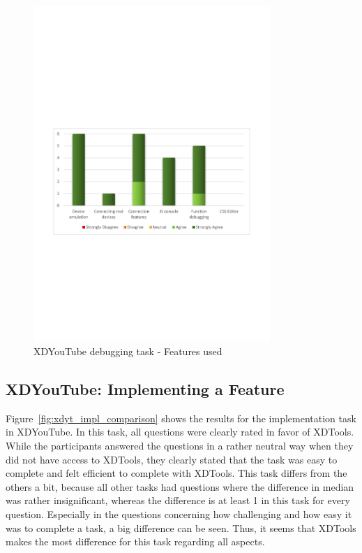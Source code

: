 \begin{figure}[H]
  \centering
    \includegraphics[width=0.8\textwidth]{images/charts/xdyt_bug_features_used.pdf}
	\caption[xdyt-bug: Features used]{XDYouTube debugging task - Features used}
	\label{fig:xdyt_bug_features_used}
\end{figure}

\subsection{XDYouTube: Implementing a Feature}

Figure~\ref{fig:xdyt_impl_comparison} shows the results for the implementation task in XDYouTube. In this task, all questions were clearly rated in favor of XDTools. While the participants answered the questions in a rather neutral way when they did not have access to XDTools, they clearly stated that the task was easy to complete and felt efficient to complete with XDTools. This task differs from the others a bit, because all other tasks had questions where the difference in median was rather insignificant, whereas the difference is at least 1 in this task for every question. Especially in the questions concerning how challenging and how easy it was to complete a task, a big difference can be seen. Thus, it seems that XDTools makes the most difference for this task regarding all aspects.

